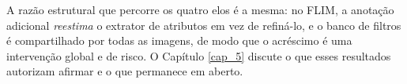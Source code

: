 A razão estrutural que percorre os quatro elos é a mesma: no \ac{FLIM}, a anotação adicional \emph{reestima} o extrator de atributos em vez de refiná-lo, e o banco de filtros é compartilhado por todas as imagens, de modo que o acréscimo é uma intervenção global e de risco. O Capítulo \ref{cap_5} discute o que esses resultados autorizam afirmar e o que permanece em aberto.

